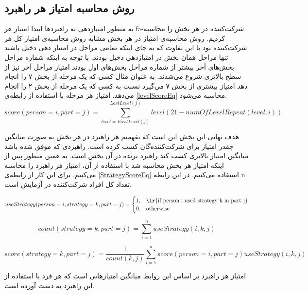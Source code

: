 \documentclass[twoside, a4paper,11pt]{book}
\numberwithin{equation}{chapter}
\numberwithin{table}{chapter}
\numberwithin{figure}{chapter}
\numberwithin{equation}{chapter}
\newcommand{\mls}[1]{\gls{fa-#1}\glsuseri{la-#1}}
\begin{document}
\subsection{روش محاسبه امتیاز هر راهبرد}
به منظور امتیازدهی به راهبرد‌ها ابتدا امتیاز هر  \mls{شرکت‌کننده} در هر بخش را محاسبه کردیم. روش محاسبه‌ی امتیاز در هر بخش مشابه روش محاسبه‌ی امتیاز کل هر شرکت‌کننده بود با این تفاوت که به جای اینکه تمامی مراحل در امتیاز دهی دخیل باشند تنها مراحل همان بخش در امتیازدهی دخیل بودند. با توجه به اینکه شماره مراحل بخش‌های آخر بیشتر از شماره مراحل بخش‌های اول بودند امتیاز مراحل آخر نیز از سطح بالاتری شروع می‌شدند. به عنوان مثال کسی که یک مرحله از بخش ۷ را انجام دهد امتیاز بیشتری از بخش ۷ می‌گیرد نسبت به کسی که یک مرحله از بخش ۲ را انجام می‌دهد. امتیاز هر مرحله با استفاده از رابطه‌ی \ref{levelScoreEq} محاسبه می‌شود.
\begin{equation}
\label{levelScoreEq}
	score(person = i, part = j) = \sum_{level = FirstLevel(j)}^{LastLevel(j)} level(21-numOfLevelRepeat(level, i))
\end{equation}

هدف نهایی این بخش این است که بفهمیم هر راهبرد در هر بخش به صورت میانگین چقدر امتیاز برای شرکت‌کننده‌گان کسب کرده است. راهبرد‌ی که موفق شده باشد میانگین امتیاز بالاتری کسب کند راهبرد برنده در آن بخش است. به همین منظور پس از اینکه امتیاز هر بخش محاسبه شد با استفاده از آن، امتیاز هر راهبرد را محاسبه می‌کنیم. برای این کار از رابطه‌ی \ref{StrategyScoreEq} استفاده می‌کنیم. در این رابطه n  تعداد کل افراد شرکت‌کننده در آزمایش است. 

\begin{equation}
\label{UseStrategyEq}
useStrategy(person = i, strategy = k, part = j) =\begin{cases}
    1 ,& \text{\lr{if person i used strategy k in part j}} \\
    0 , & \text{otherwise}
    \end{cases}
\end{equation}


\begin{equation}
count(strategy = k, part = j) = \sum_{i=1}^{n} useStrategy(i, k, j)
\end{equation}

\begin{equation}
\label{StrategyScoreEq}
	score(strategy = k, part = j) = \frac{1}{count(k, j)} \sum_{i=1}^{n} score(person = i, part = j) useStrategy(i, k, j)
\end{equation}

امتیاز هر راهبرد بر اساس این روابط میانگین امتیازهایی است که هر فرد با استفاده از این راهبرد به دست آورده است.
\end{document}
